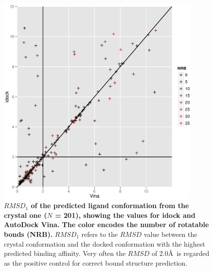 \documentclass[10pt]{article}
\begin{document}
\begin{figure}[!ht]
\begin{center}
\includegraphics[width=4in]{VinaConf1RMSD-idockConf1RMSD.eps}
\end{center}
\caption{
{\bf $RMSD_1$ of the predicted ligand conformation from the crystal one ($N$ = 201), showing the values for idock and AutoDock Vina. The color encodes the number of rotatable bonds (NRB).} $RMSD_1$ refers to the $RMSD$ value between the crystal conformation and the docked conformation with the highest predicted binding affinity. Very often the $RMSD$ of 2.0\AA\ is regarded as the positive control for correct bound structure prediction.
}
\label{VinaConf1RMSD-idockConf1RMSD}
\end{figure}
\end{document}
